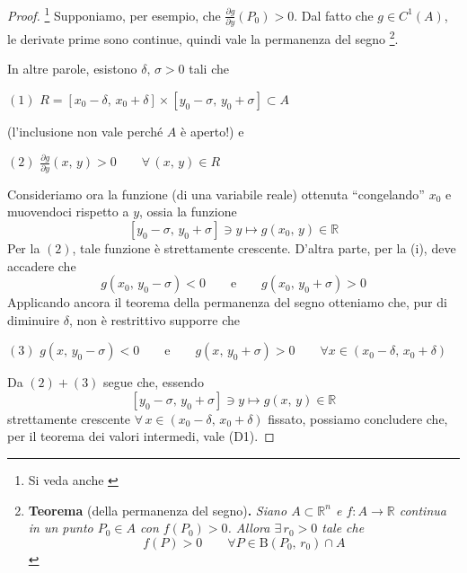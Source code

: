 \begin{proof}\footnote{Si veda anche \cite{Conti1993}}
Supponiamo, per esempio, che $\frac{\partial g}{\partial y} (P_0) > 0$. Dal fatto che $g \in C^1(A)$, le derivate prime sono continue, quindi vale la permanenza del segno \footnote{
\textbf{Teorema }\textnormal{(della permanenza del segno)}\textbf{.}\textit{
Siano $A \subset \mathbb{R}^n$ e $f : A \longrightarrow \mathbb{R}$ continua in un punto $P_0 \in A$ con $f(P_0) > 0$. Allora $\exists \, r_0 > 0$ tale che
$$
f(P) > 0 \qquad \forall P \in \mathrm{B}(P_0,\,r_0) \cap A
$$
}}.
\begin{center}
\def\svgwidth{10cm}

\end{center}
In altre parole, esistono $\delta,\,\sigma > 0$ tali che
\begin{center}
$\mathrm{(1)}$
\hfill
$\displaystyle
R = [x_0 - \delta,\, x_0 + \delta] \times [y_0 - \sigma,\, y_0 + \sigma] \subset A
$
\hfill \null \\
\end{center}
(l'inclusione non vale perché $A$ è aperto!) e
\begin{center}
$\mathrm{(2)}$
\hfill
$\displaystyle
\frac{\partial g}{\partial y}(x,\,y) > 0 \qquad \forall \, (x,\,y) \in R
$
\hfill \null \\
\end{center}
Consideriamo ora la funzione (di una variabile reale) ottenuta ``congelando'' $x_0$ e muovendoci rispetto a $y$, ossia la funzione
$$
[y_0-\sigma,\,y_0+\sigma] \ni y \longmapsto g(x_0,\,y) \in \mathbb{R}
$$
Per la $\mathrm{(2)}$, tale funzione è strettamente crescente. D'altra parte, per la (i), deve accadere che
$$
g(x_0,\,y_0-\sigma) < 0 \qquad \text{e} \qquad g(x_0,\,y_0+\sigma) > 0
$$
Applicando ancora il teorema della permanenza del segno otteniamo che, pur di diminuire $\delta$, non è restrittivo supporre che
\begin{center}
$\mathrm{(3)}$
\hfill
$\displaystyle
g(x,\,y_0-\sigma) < 0 \qquad \text{e} \qquad g(x,\,y_0+\sigma) > 0
\qquad \forall x \in (x_0-\delta,\, x_0+\delta)
$
\hfill \null \\
\end{center}
Da $\mathrm{(2)}+\mathrm{(3)}$ segue che, essendo
$$
[y_0-\sigma,\,y_0+\sigma] \ni y \longmapsto g(x,\,y) \in \mathbb{R}
$$
strettamente crescente $\forall \, x \in (x_0-\delta,\, x_0+\delta)$ fissato, possiamo concludere che, per il teorema dei valori intermedi, vale (D1).


\end{proof}
